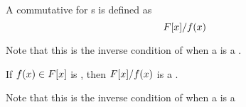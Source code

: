 \begin{definition}\label{def:Polynomial_Ring_Properties-Commutative_Ring}
  A commutative  for s is defined as
  \begin{equation}\label{eq:Polynomial_Ring_Properties-Commutative_Ring}
    F[x] / f(x)
  \end{equation}
  \begin{remark}
    Note that this is the inverse condition of when a  is a .
  \end{remark}
\end{definition}

\begin{definition}[Field]\label{def:Polynomial_Ring_Properties-Field}
  If $f(x) \in F[x]$ is , then $F[x] / f(x)$ is a .
  \begin{remark}
    Note that this is the inverse condition of when a  is a 
  \end{remark}
\end{definition}

